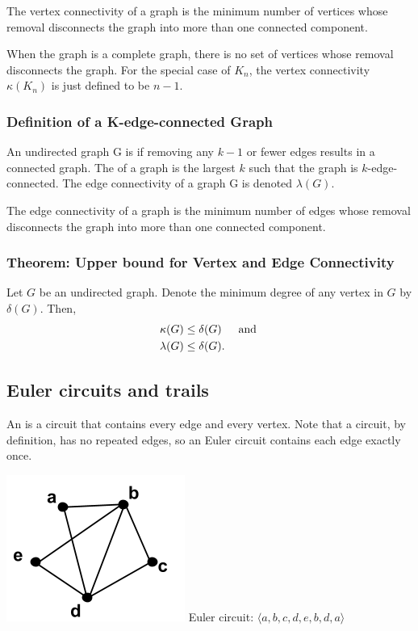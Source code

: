 The vertex connectivity of a graph is the minimum number of vertices whose removal disconnects the graph into more than one connected component.

When the graph is a complete graph, there is no set of vertices whose removal disconnects the graph. For the special case of $K_n$, the vertex connectivity $\kappa(K_n)$ is just defined to be $n - 1$.

\subsubsection*{Definition of a K-edge-connected Graph}
An undirected graph G is  if removing any $k - 1$ or fewer edges results in a connected graph. The  of a graph is the largest $k$ such that the graph is $k$-edge-connected. The edge connectivity of a graph G is denoted $\lambda(G)$.

The edge connectivity of a graph is the minimum number of edges whose removal disconnects the graph into more than one connected component.

\subsubsection*{Theorem: Upper bound for Vertex and Edge Connectivity}
Let $G$ be an undirected graph. Denote the minimum degree of any vertex in $G$ by $\delta(G)$. Then,
\begin{align*}
  \kappa(G)  & \leq \delta(G)~~~\operatorname{~\text{and}~} \\
  \lambda(G) & \leq \delta(G).
\end{align*}

\subsection{Euler circuits and trails}
An  is a circuit that contains every edge and every vertex. Note that a circuit, by definition, has no repeated edges, so an Euler circuit contains each edge exactly once.
\begin{center}
  \includegraphics[width=0.25\linewidth]{resources/euler circuit example.png}
  Euler circuit: $\langle a,b,c,d,e,b,d,a \rangle$
\end{center}


